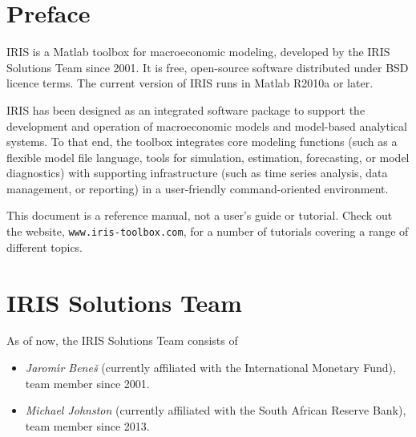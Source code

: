 
\section *{Preface}

IRIS is a Matlab\raisebox{0.3em}{\tiny\textregistered} toolbox for macroeconomic modeling, developed by the IRIS Solutions Team since 2001. It is free, open-source software distributed under BSD licence terms. The current version of IRIS runs in Matlab R2010a or later.

IRIS has been designed as an integrated software package to support the development and operation of macroeconomic models and model-based analytical systems. To that end, the toolbox integrates core modeling functions (such as a flexible model file language, tools for simulation, estimation, forecasting, or model diagnostics) with supporting infrastructure (such as time series analysis, data management, or reporting) in a user-friendly command-oriented environment.

This document is a reference manual, not a user's guide or tutorial. Check out the website, \texttt{www.iris-toolbox.com}, for a number of tutorials covering a range of different topics.

\section*{IRIS Solutions Team}

As of now, the IRIS Solutions Team consists of
\begin{itemize}
\item \textit{Jarom\'\i r Bene\v s} (currently affiliated with the International Monetary Fund), team member since 2001.
\item \textit{Michael Johnston} (currently affiliated with the South African Reserve Bank), team member since 2013.
\end{itemize}